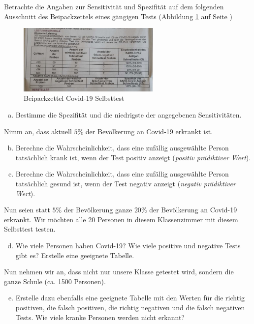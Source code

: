 \documentclass[%
11pt,%
twoside,%
titlepage,%
german,%
headsepline%
]{scrartcl}
\begin{document}
\begin{ueb}
Betrachte die Angaben zur Sensitivität und Spezifität auf dem folgenden Ausschnitt des Beipackzettels eines gängigen Tests (Abbildung \ref{fig:covidchart} auf Seite \pageref{fig:covidchart})

\begin{figure}
    \centering
    \includegraphics[width=0.618\textwidth]{pictures/Covidchart.jpeg}
    \caption{Beipackzettel Covid-19 Selbsttest}
    \label{fig:covidchart}
\end{figure}

\begin{enumerate}[a)]
    \item Bestimme die Spezifität und die niedrigste der angegebenen Sensitivitäten.
\end{enumerate}
Nimm an, dass aktuell $5\%$ der Bevölkerung an Covid-19 erkrankt ist.
\begin{enumerate}[a)]
\setcounter{enumi}{1}
    \item Berechne die Wahrscheinlichkeit, dass eine zufällig  ausgewählte Person  tatsächlich krank ist, wenn der Test positiv anzeigt (\emph{positiv prädiktiver Wert}).
    \item Berechne die Wahrscheinlichkeit, dass eine zufällig ausgewählte Person tatsächlich gesund ist, wenn der Test negativ anzeigt (\emph{negativ prädiktiver Wert}).
\end{enumerate}
Nun seien statt $5\% 
$ der Bevölkerung ganze $20\%$ der Bevölkerung an Covid-19 erkrankt. Wir möchten alle 20 Personen in diesem Klassenzimmer mit diesem Selbsttest testen.

\begin{enumerate}[a)]
\setcounter{enumi}{3}
    \item Wie viele Personen haben Covid-19? Wie viele positive und negative Tests gibt es? Erstelle eine geeignete Tabelle.
\end{enumerate}
Nun nehmen wir an, dass nicht nur unsere Klasse getestet wird, sondern die ganze Schule (ca. 1500 Personen).

\begin{enumerate}[a)]
\setcounter{enumi}{4}
    \item Erstelle dazu ebenfalls eine geeignete Tabelle mit den Werten für die richtig positiven, die falsch positiven, die richtig negativen und die falsch negativen Tests.
Wie viele kranke Personen werden nicht erkannt?
\end{enumerate}
\end{ueb}
\end{document}
